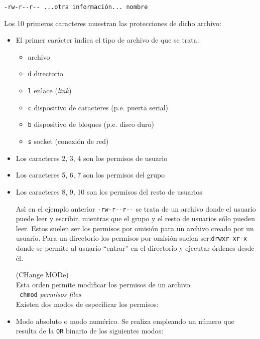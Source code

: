 {\verb+-rw-r--r-- +}{\tt  ...otra informaci{\'o}n... }{\verb+nombre+}

Los 10 primeros caracteres muestran las protecciones de dicho archivo:

\begin{itemize}

\item  El primer car{\'a}cter indica el tipo de archivo de que se trata:
\begin{itemize}
\item archivo
\item \verb+d+ directorio
\item \verb+l+ enlace ({\it link})
\item \verb+c+ dispositivo de caracteres (p.e. puerta serial)
\item \verb+b+ dispositivo de bloques (p.e. disco duro)
\item \verb+s+ socket (conexi{\'o}n de red) 
\end{itemize}

\item Los caracteres 2, 3, 4 son los permisos de usuario
\item Los caracteres 5, 6, 7 son los permisos del grupo 
\item Los caracteres 8, 9, 10 son los permisos del resto de usuarios
                                                               
  As{\'\i} en el ejemplo anterior {\verb+-rw-r--r--+} se trata de un
  archivo donde el usuario puede leer y escribir, mientras que el
  grupo y el resto de usuarios s{\'o}lo pueden leer. Estos suelen ser los
  permisos por omisi{\'o}n para un archivo creado por un usuario. Para un
  directorio los permisos por omisi{\'o}n suelen ser:{\verb+drwxr-xr-x+}
  donde se permite al usuario ``entrar'' en el directorio y ejecutar
  {\'o}rdenes desde {\'e}l.
  
  \noindent
{} (CHange MODe)\\
  Esta orden permite modificar los permisos de un archivo.\\
{\verb+ chmod+} {\it permisos files}\\
 Existen dos modos de especificar los permisos:

 
\item Modo absoluto o modo num{\'e}rico. Se realiza empleando un n{\'u}mero
  que resulta de la \verb+OR+ binario de los siguientes modos:


\end{itemize}
